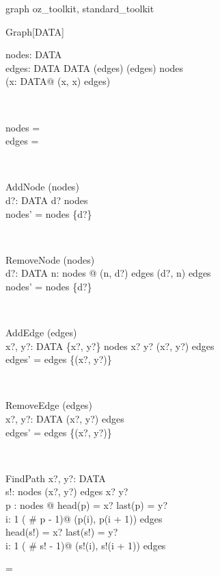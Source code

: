 \begin{zsection}
  \SECTION graph \parents oz\_toolkit, standard\_toolkit
\end{zsection}

\zedindent=2mm
\begin{class}{Graph}[DATA]
\also
\begin{state}
nodes:  \finset DATA \\ 
edges: DATA \rel DATA
\where
 \dom (edges) \cup  \ran (edges) \subseteq nodes \\ 
 \lnot (\exists x: DATA@ (x, x) \in edges)
\end{state}\\
\begin{init}
nodes = \emptyset \\ 
edges = \emptyset
\end{init} \\
\begin{op}{AddNode}
\Delta(nodes)\\
d?: DATA 
\where
 d? \notin nodes \\ 
 nodes' = nodes \cup \{d?\} 
\end{op} \\
\begin{op}{RemoveNode}
\Delta (nodes)\\
d?: DATA 
\where
  \lnot \exists n: nodes @ (n, d?) \in edges \lor 
    (d?, n) \in edges\\ 
 nodes' = nodes \setminus \{d?\} 
\end{op} \\
\begin{op}{AddEdge}
\Delta (edges)\\
x?, y?: DATA 
\where
 \{x?, y?\} \subseteq nodes \land  x? \neq y? \land 
         (x?, y?) \notin edges \\ 
 edges' = edges \cup \{(x?, y?)\} 
\end{op}\\
\begin{op}{RemoveEdge}
\Delta (edges)\\
x?, y?: DATA 
\where
 (x?, y?) \in edges \\ 
 edges' = edges \setminus \{(x?, y?)\} \\ 
\end{op} \\
\begin{op}{FindPath}
x?, y?: DATA \\ 
s!:  \iseq nodes 
\where
 (x?, y?) \in edges \plus  \land x? \neq y? \land\\
       \exists p : \iseq nodes @ head(p) = x? \land last(p) = y? \land\\
       \forall i: 1 \upto ( \# p - 1)@ (p(i), p(i + 1)) \in edges \\ 
 head(s!) = x? \land last(s!) = y?\\ 
\forall i: 1 \upto ( \# s! - 1)@ (s!(i), s!(i + 1)) \in edges 
\end{op} 
\end{class} 
\zedindent=\leftmargini
